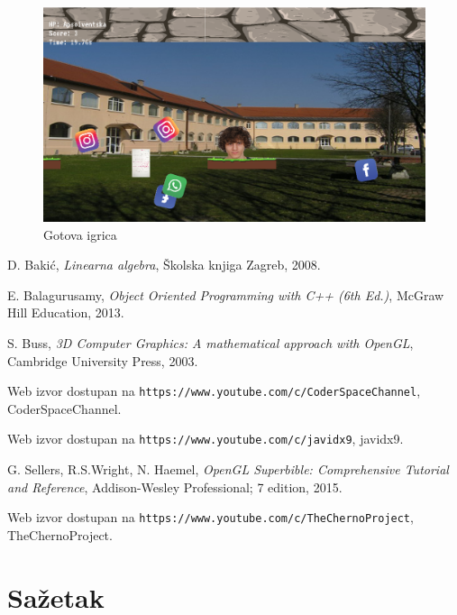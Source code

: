 \documentclass{mathos}
\begin{document}
\begin{figure}[H]
    \centering
    \includegraphics[scale=0.4]{Slike/Platformer.png}
    \caption{Gotova igrica}
    \label{im_Platformer}
\end{figure}

\begin{thebibliography}{30}

    {\sc D. Bakić}, {\em Linearna algebra}, Školska knjiga Zagreb, 2008.

    {\sc E. Balagurusamy}, {\em Object Oriented Programming with C++ (6th Ed.)}, McGraw Hill Education, 2013.

    {\sc S. Buss}, {\em 3D Computer Graphics: A mathematical approach with OpenGL}, Cambridge University Press, 2003.

     Web izvor dostupan na
        {\verb"https://www.youtube.com/c/CoderSpaceChannel"}, CoderSpaceChannel.

     Web izvor dostupan na
        {\verb"https://www.youtube.com/c/javidx9"}, javidx9.

    {\sc G. Sellers, R.S.Wright, N. Haemel}, {\em OpenGL Superbible: Comprehensive Tutorial and Reference}, Addison-Wesley Professional; 7 edition, 2015.

     Web izvor dostupan na
        {\verb"https://www.youtube.com/c/TheChernoProject"}, TheChernoProject.
\end{thebibliography}


\chapter*{Sažetak}
\end{document}
